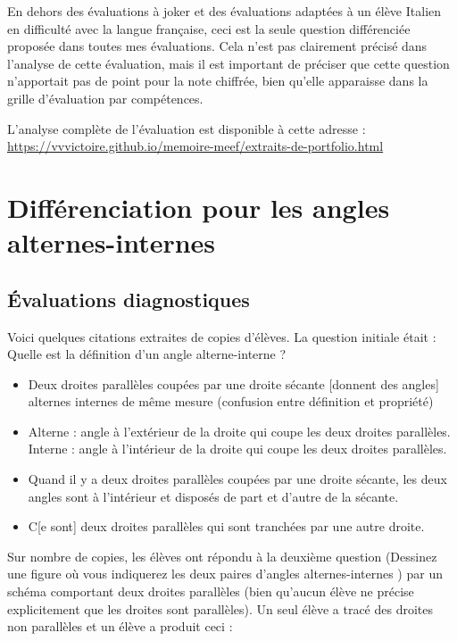 En dehors des évaluations à joker et des évaluations adaptées à un élève Italien en difficulté avec la langue française, ceci est la seule question différenciée proposée dans toutes mes évaluations. Cela n'est pas clairement précisé dans l'analyse de cette évaluation, mais il est important de préciser que cette question n'apportait pas de point pour la note chiffrée, bien qu'elle apparaisse dans la grille d'évaluation par compétences.

L'analyse complète de l'évaluation est disponible à cette adresse : \url{https://vvvictoire.github.io/memoire-meef/extraits-de-portfolio.html}

\clearpage

\section{Différenciation pour les angles alternes-internes}

\subsection{Évaluations diagnostiques}\label{annexe:angles-prod1}

Voici quelques citations extraites de copies d'élèves. La question initiale était : \og Quelle est la définition d'un angle alterne-interne ? \fg{}
\begin{itemize}
\item Deux droites parallèles coupées par une droite sécante [donnent des angles] alternes internes de même mesure (confusion entre définition et propriété)
\item Alterne : angle à l'extérieur de la droite qui coupe les deux droites parallèles. Interne : angle à l'intérieur de la droite qui coupe les deux droites parallèles.
\item Quand il y a deux droites parallèles coupées par une droite sécante, les deux angles sont à l'intérieur et disposés de part et d'autre de la sécante.
\item C[e sont] deux droites parallèles qui sont tranchées par une autre droite.
\end{itemize}

Sur nombre de copies, les élèves ont répondu à la deuxième question (\og Dessinez une figure où vous indiquerez les deux paires d'angles alternes-internes \fg{}) par un schéma comportant deux droites parallèles (bien qu'aucun élève ne précise explicitement que les droites sont parallèles). Un seul élève a tracé des droites non parallèles et un élève a produit ceci :

